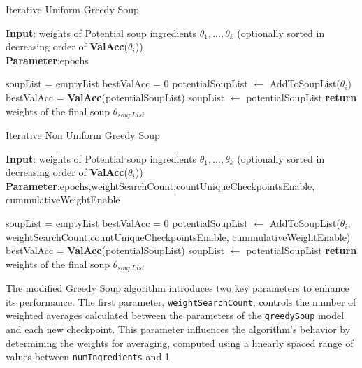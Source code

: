 \documentclass[10pt,twocolumn,letterpaper]{article}
\begin{document}
\begin{algorithm}[H]
\caption{Iterative Uniform Greedy Soup}
\label{alg:algorithm}
\textbf{Input}: weights of Potential soup ingredients ${\theta_1, ..., \theta_k}$ (optionally sorted in decreasing order of \textbf{ValAcc}($\theta_i$))\\
\textbf{Parameter}:epochs\\
\begin{algorithmic}[1] %
\STATE soupList = emptyList
\STATE bestValAcc = 0
\STATE potentialSoupList $\leftarrow$ AddToSoupList($\theta_i$)
\STATE bestValAcc = \textbf{ValAcc}(potentialSoupList)
\STATE soupList $\leftarrow$ potentialSoupList
\ENDIF
\ENDFOR
\ENDFOR
\STATE \textbf{return} weights of the final soup $\theta_{soupList}$
\end{algorithmic}
\end{algorithm}



\begin{algorithm}[H]
\caption{Iterative Non Uniform Greedy Soup}
\label{alg:algorithm}
\textbf{Input}: weights of Potential soup ingredients ${\theta_1, ..., \theta_k}$ (optionally sorted in decreasing order of \textbf{ValAcc}($\theta_i$))\\
\textbf{Parameter}:epochs,weightSearchCount,countUniqueCheckpointsEnable,
cummulativeWeightEnable
\begin{algorithmic}[1] %
\STATE soupList = emptyList
\STATE bestValAcc = 0
\STATE potentialSoupList $\leftarrow$ AddToSoupList($\theta_i$,
weightSearchCount,countUniqueCheckpointsEnable,
cummulativeWeightEnable)
\STATE bestValAcc = \textbf{ValAcc}(potentialSoupList)
\STATE soupList $\leftarrow$ potentialSoupList
\ENDIF
\ENDFOR
\ENDFOR
\STATE \textbf{return} weights of the final soup $\theta_{soupList}$
\end{algorithmic}
\end{algorithm}

The modified Greedy Soup algorithm introduces two key parameters to enhance its performance. The first parameter, \texttt{weightSearchCount}, controls the number of weighted averages calculated between the parameters of the \texttt{greedySoup} model and each new checkpoint. This parameter influences the algorithm's behavior by determining the weights for averaging, computed using a linearly spaced range of values between \texttt{numIngredients} and 1.
\end{document}

